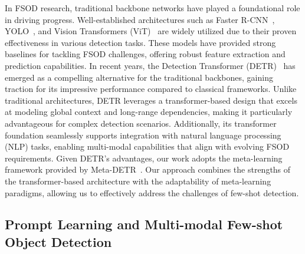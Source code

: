 In FSOD research, traditional backbone networks have played a foundational role in driving progress. Well-established architectures such as Faster R-CNN~\cite{RenHGS15}, YOLO~\cite{redmon2016yolo}, and Vision Transformers (ViT)~\cite{dosovitskiy2020vit} are widely utilized due to their proven effectiveness in various detection tasks. These models have provided strong baselines for tackling FSOD challenges, offering robust feature extraction and prediction capabilities.
In recent years, the Detection Transformer (DETR)~\cite{Carion20DETR} has emerged as a compelling alternative for the traditional backbones, gaining traction for its impressive performance compared to classical frameworks. Unlike traditional architectures, DETR leverages a transformer-based design that excels at modeling global context and long-range dependencies, making it particularly advantageous for complex detection scenarios. Additionally, its transformer foundation seamlessly supports integration with natural language processing (NLP) tasks, enabling multi-modal capabilities that align with evolving FSOD requirements.
Given DETR's advantages, our work adopts the meta-learning framework provided by Meta-DETR~\cite{Zhang23MetaDETR}. Our approach combines the strengths of the transformer-based architecture with the adaptability of meta-learning paradigms, allowing us to effectively address the challenges of few-shot detection.  

\subsection{Prompt Learning and Multi-modal Few-shot Object Detection}
\label{sec:MM-FSOD}

